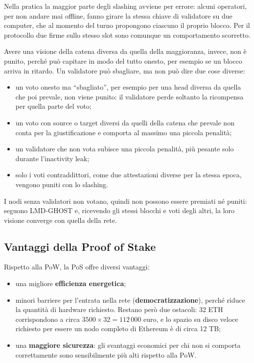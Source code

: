 \documentclass[a4paper, 11pt, oneside]{book}
\begin{document}
	\begin{nota}
		Nella pratica la maggior parte degli slashing avviene per errore: alcuni
		operatori, per non andare mai offline, fanno girare la stessa chiave di validatore
		su due computer, che al momento del turno propongono ciascuno il proprio blocco.
		Per il protocollo due firme sullo stesso slot sono comunque un comportamento
		scorretto.
	\end{nota}

	Avere una visione della catena diversa da quella della maggioranza, invece, non è
	punito, perché può capitare in modo del tutto onesto, per esempio se un blocco arriva
	in ritardo. Un validatore può sbagliare, ma non può dire due cose diverse:
	\begin{itemize}
		\item un voto onesto ma ``sbagliato'', per esempio per una head diversa da quella
			che poi prevale, non viene punito: il validatore perde soltanto la ricompensa
			per quella parte del voto;
		\item un voto con source o target diversi da quelli della catena che prevale non
			conta per la giustificazione e comporta al massimo una piccola penalità;
		\item un validatore che non vota subisce una piccola penalità, più pesante solo
			durante l'inactivity leak;
		\item solo i voti contraddittori, come due attestazioni diverse per la stessa
			epoca, vengono puniti con lo slashing.
	\end{itemize}
	I nodi senza validatori non votano, quindi non possono essere premiati né puniti:
	seguono LMD-GHOST e, ricevendo gli stessi blocchi e voti degli altri, la loro visione
	converge con quella della rete.
	\subsection{Vantaggi della Proof of Stake}
	Rispetto alla PoW, la PoS offre diversi vantaggi:
	\begin{itemize}
		\item una migliore \textbf{efficienza energetica};
		\item minori barriere per l'entrata nella rete (\textbf{democratizzazione}),
			perché riduce la quantità di hardware richiesto. Restano però due ostacoli:
			32 ETH corrispondono a circa $3500 \times 32 = 112\,000$ euro, e lo spazio su
			disco veloce richiesto per essere un nodo completo di Ethereum è di circa
			12 TB;
		\item una \textbf{maggiore sicurezza}: gli svantaggi economici per chi non si
			comporta correttamente sono sensibilmente più alti rispetto alla PoW.
	\end{itemize}
\end{document}
